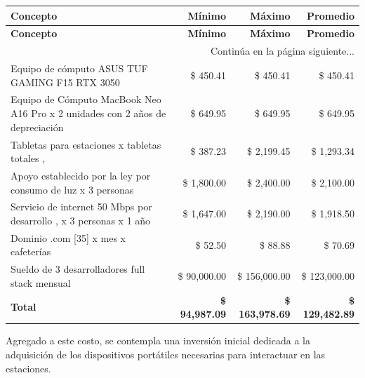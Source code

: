 \begin{tabularx}{\textwidth}{X r r r}
\caption{Costo Total de Operación Mensual.} \label{tab:costo_total_operacion_mensual}\\
\toprule
\textbf{Concepto} & \textbf{Mínimo} & \textbf{Máximo} & \textbf{Promedio} \\
\midrule
\endfirsthead

\toprule
\textbf{Concepto} & \textbf{Mínimo} & \textbf{Máximo} & \textbf{Promedio} \\
\midrule
\endhead

\midrule
\multicolumn{4}{r}{\small Continúa en la página siguiente...} \\
\endfoot
\bottomrule
\endlastfoot

Equipo de cómputo ASUS TUF GAMING F15 RTX 3050 \cite{amazon2026asus} & \$ 450.41 & \$ 450.41 & \$ 450.41 \\
\addlinespace
Equipo de Cómputo MacBook Neo A16 Pro \cite{amazon2026apple} x 2 unidades con 2 años de depreciación & \$ 649.95 & \$ 649.95 & \$ 649.95 \\
\addlinespace
Tabletas para estaciones x tabletas totales \cite{amazon2026novojoy}, \cite{amazon2026xiaomi} & \$ 387.23 & \$ 2,199.45 & \$ 1,293.34 \\
\addlinespace
Apoyo establecido por la ley por consumo de luz \cite{conejo2024telework} x 3 personas & \$ 1,800.00 & \$ 2,400.00 & \$ 2,100.00 \\
\addlinespace
Servicio de internet 50 Mbps por desarrollo \cite{bluetelecomm2026internet}, \cite{mega2026internet} x 3 personas x 1 año & \$ 1,647.00 & \$ 2,190.00 & \$ 1,918.50 \\
\addlinespace
Dominio .com [35] \cite{donweb2026dominio} x mes x cafeterías & \$ 52.50 & \$ 88.88 & \$ 70.69 \\
\addlinespace
Sueldo de 3 desarrolladores full stack \cite{glassdoor2026sueldos} mensual & \$ 90,000.00 & \$ 156,000.00 & \$ 123,000.00 \\
\addlinespace
\midrule
\textbf{Total} & \textbf{\$ 94,987.09} & \textbf{\$ 163,978.69} & \textbf{\$ 129,482.89} \\
\end{tabularx}
\endgroup

Agregado a este costo, se contempla una inversión inicial dedicada a la adquisición de los dispositivos portátiles necesarias para interactuar en las estaciones.

\begingroup
\setlength{\LTleft}{\fill}
\setlength{\LTright}{\fill}

